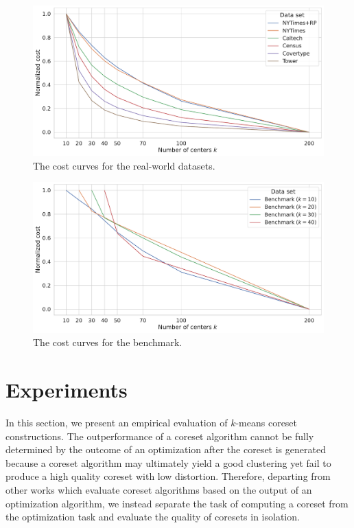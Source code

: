 
\begin{figure}
  \caption{The cost curves for the real-world datasets.}
  \label{fig:cost-curves-real-world-datasets}
  \includegraphics[width=1\linewidth]{figures/cost-curves-real-world-datasets.pdf}
\end{figure}


\begin{figure}
  \caption{The cost curves for the benchmark.}
  \label{fig:cost-curves-benchmark}
  \includegraphics[width=1\linewidth]{figures/cost-curves-benchmark.pdf}
\end{figure}


\section{Experiments} \label{sec:experiments}
In this section, we present an empirical evaluation of $k$-means coreset constructions.
The outperformance of a coreset algorithm cannot be fully determined by the outcome of an optimization after the coreset is generated because a coreset algorithm may ultimately yield a good clustering yet fail to produce a high quality coreset with low distortion.
Therefore, departing from other works which evaluate coreset algorithms based on the output of an optimization algorithm, we instead separate the task of computing a coreset from the optimization task and evaluate the quality of coresets in isolation. 

